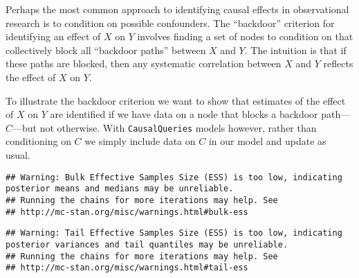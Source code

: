 \documentclass[
  12pt,
]{book}
\newenvironment{Shaded}{\begin{snugshade}}{\end{snugshade}}
\newcommand{\CommentTok}[1]{\textcolor[rgb]{0.56,0.35,0.01}{\textit{#1}}}
\newcommand{\DataTypeTok}[1]{\textcolor[rgb]{0.13,0.29,0.53}{#1}}
\newcommand{\DecValTok}[1]{\textcolor[rgb]{0.00,0.00,0.81}{#1}}
\newcommand{\KeywordTok}[1]{\textcolor[rgb]{0.13,0.29,0.53}{\textbf{#1}}}
\newcommand{\NormalTok}[1]{#1}
\newcommand{\OperatorTok}[1]{\textcolor[rgb]{0.81,0.36,0.00}{\textbf{#1}}}
\newcommand{\OtherTok}[1]{\textcolor[rgb]{0.56,0.35,0.01}{#1}}
\newcommand{\StringTok}[1]{\textcolor[rgb]{0.31,0.60,0.02}{#1}}
\begin{document}
Perhaps the most common approach to identifying causal effects in observational research is to condition on possible confounders. The ``backdoor'' criterion for identifying an effect of \(X\) on \(Y\) involves finding a set of nodes to condition on that collectively block all ``backdoor paths'' between \(X\) and \(Y\). The intuition is that if these paths are blocked, then any systematic correlation between \(X\) and \(Y\) reflects the effect of \(X\) on \(Y\).

To illustrate the backdoor criterion we want to show that estimates of the effect of \(X\) on \(Y\) are identified if we have data on a node that blocks a backdoor path---\(C\)---but not otherwise. With \texttt{CausalQueries} models however, rather than conditioning on \(C\) we simply include data on \(C\) in our model and update as usual.

\begin{Shaded}
\end{Shaded}

\begin{verbatim}
## Warning: Bulk Effective Samples Size (ESS) is too low, indicating posterior means and medians may be unreliable.
## Running the chains for more iterations may help. See
## http://mc-stan.org/misc/warnings.html#bulk-ess
\end{verbatim}

\begin{verbatim}
## Warning: Tail Effective Samples Size (ESS) is too low, indicating posterior variances and tail quantiles may be unreliable.
## Running the chains for more iterations may help. See
## http://mc-stan.org/misc/warnings.html#tail-ess
\end{verbatim}
\end{document}
